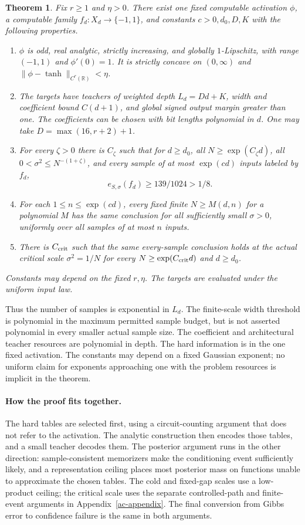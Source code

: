 \documentclass[11pt]{article}
\newtheorem{theorem}{Theorem}[section]
\theoremstyle{remark}\newtheorem{remark}[theorem]{Remark}
\newcommand{\R}{\mathbb R}
\begin{document}
\begin{theorem}\label{thm:main}
Fix $r\ge1$ and $\eta>0$. There exist one fixed computable activation
$\phi$, a computable family $f_d:X_d\to\{-1,1\}$, and constants
$c>0,d_0,D,K$ with the following properties.
\begin{enumerate}[label=(\roman*),leftmargin=*]
\item $\phi$ is odd, real analytic, strictly increasing, and globally
$1$-Lipschitz, with range $(-1,1)$ and $\phi'(0)=1$.
It is strictly concave on $(0,\infty)$ and
$\|\phi-\tanh\|_{C^r(\R)}<\eta$.
\item The targets have teachers of weighted depth
$L_d=Dd+K$, width and coefficient bound $C(d+1)$, and global signed
output margin greater than one. The coefficients can be chosen
with bit lengths polynomial in $d$.
One may take $D=\max(16,r+2)+1$.
\item For every $\zeta>0$ there is $C_\zeta$ such that for
$d\ge d_0$, all $N\ge\exp(C_\zeta d)$, all
$0<\sigma^2\le N^{-(1+\zeta)}$, and every sample of at most
$\exp(cd)$ inputs labeled by $f_d$,
\[
 e_{S,\sigma}(f_d)\ge139/1024>1/8.
\]
\item For each $1\le n\le\exp(cd)$, every fixed finite
$N\ge M(d,n)$ for a polynomial $M$ has the same conclusion
for all sufficiently small $\sigma>0$, uniformly over all samples
of at most $n$ inputs.
\item There is $C_{\rm crit}$ such that the same every-sample
conclusion holds at the actual critical scale $\sigma^2=1/N$
for every $N\ge\exp(C_{\rm crit}d)$ and $d\ge d_0$.
\end{enumerate}
Constants may depend on the fixed $r,\eta$. The targets are
evaluated under the uniform input law.
\end{theorem}
Thus the number of samples is exponential in $L_d$. The finite-scale
width threshold is polynomial in the maximum permitted sample budget,
but is not asserted polynomial in every smaller actual sample size.
The coefficient and architectural teacher resources are polynomial
in depth. The hard information is in the one fixed activation.
The constants may depend on a fixed Gaussian exponent; no uniform
claim for exponents approaching one with the problem resources is
implicit in the theorem.

\paragraph{How the proof fits together.}
The hard tables are selected first, using a circuit-counting argument that
does not refer to the activation. The analytic construction then encodes
those tables, and a small teacher decodes them. The posterior argument
runs in the other direction: sample-consistent memorizers make the
conditioning event sufficiently likely, and a representation ceiling
places most posterior mass on functions unable to approximate the chosen
tables. The cold and fixed-gap scales use a low-product ceiling; the
critical scale uses the separate controlled-path and finite-event
arguments in Appendix~\ref{ac-appendix}. The final conversion from Gibbs
error to confidence failure is the same in both arguments.
\end{document}
